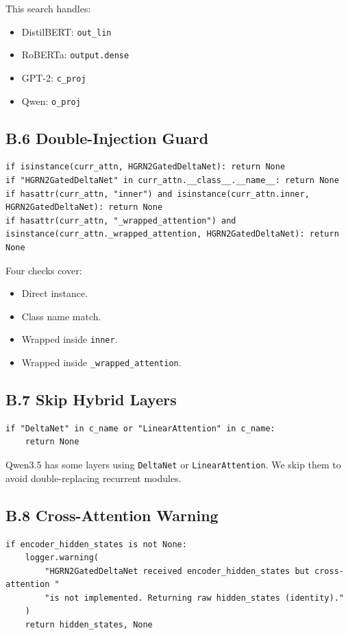 This search handles:
\begin{itemize}
\item DistilBERT: \texttt{out\_lin}
\item RoBERTa: \texttt{output.dense}
\item GPT-2: \texttt{c\_proj}
\item Qwen: \texttt{o\_proj}

\end{itemize}
\subsection{B.6 Double-Injection Guard}

\begin{lstlisting}
if isinstance(curr_attn, HGRN2GatedDeltaNet): return None
if "HGRN2GatedDeltaNet" in curr_attn.__class__.__name__: return None
if hasattr(curr_attn, "inner") and isinstance(curr_attn.inner, HGRN2GatedDeltaNet): return None
if hasattr(curr_attn, "_wrapped_attention") and isinstance(curr_attn._wrapped_attention, HGRN2GatedDeltaNet): return None
\end{lstlisting}

Four checks cover:
\begin{itemize}
\item Direct instance.
\item Class name match.
\item Wrapped inside \texttt{inner}.
\item Wrapped inside \texttt{\_wrapped\_attention}.

\end{itemize}
\subsection{B.7 Skip Hybrid Layers}

\begin{lstlisting}
if "DeltaNet" in c_name or "LinearAttention" in c_name:
    return None
\end{lstlisting}

Qwen3.5 has some layers using \texttt{DeltaNet} or \texttt{LinearAttention}. We skip them 
to avoid double-replacing recurrent modules.

\subsection{B.8 Cross-Attention Warning}

\begin{lstlisting}
if encoder_hidden_states is not None:
    logger.warning(
        "HGRN2GatedDeltaNet received encoder_hidden_states but cross-attention "
        "is not implemented. Returning raw hidden_states (identity)."
    )
    return hidden_states, None
\end{lstlisting}

